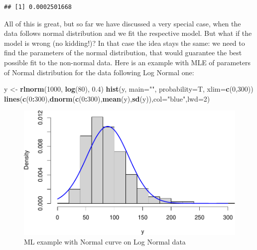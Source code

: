 \documentclass[
]{book}
\newenvironment{Shaded}{\begin{snugshade}}{\end{snugshade}}
\newcommand{\DataTypeTok}[1]{\textcolor[rgb]{0.13,0.29,0.53}{#1}}
\newcommand{\DecValTok}[1]{\textcolor[rgb]{0.00,0.00,0.81}{#1}}
\newcommand{\FloatTok}[1]{\textcolor[rgb]{0.00,0.00,0.81}{#1}}
\newcommand{\KeywordTok}[1]{\textcolor[rgb]{0.13,0.29,0.53}{\textbf{#1}}}
\newcommand{\NormalTok}[1]{#1}
\newcommand{\OperatorTok}[1]{\textcolor[rgb]{0.81,0.36,0.00}{\textbf{#1}}}
\newcommand{\StringTok}[1]{\textcolor[rgb]{0.31,0.60,0.02}{#1}}
\theoremstyle{definition}
\theoremstyle{definition}
\theoremstyle{definition}
\theoremstyle{definition}
\theoremstyle{remark}
\begin{document}
\begin{verbatim}
## [1] 0.0002501668
\end{verbatim}

All of this is great, but so far we have discussed a very special case, when the data follows normal distribution and we fit the respective model. But what if the model is wrong (no kidding!)? In that case the idea stays the same: we need to find the parameters of the normal distribution, that would guarantee the best possible fit to the non-normal data. Here is an example with MLE of parameters of Normal distribution for the data following Log Normal one:

\begin{Shaded}
\begin{Highlighting}[]
\NormalTok{y \textless{}{-}}\StringTok{ }\KeywordTok{rlnorm}\NormalTok{(}\DecValTok{1000}\NormalTok{, }\KeywordTok{log}\NormalTok{(}\DecValTok{80}\NormalTok{), }\FloatTok{0.4}\NormalTok{)}
\KeywordTok{hist}\NormalTok{(y, }\DataTypeTok{main=}\StringTok{""}\NormalTok{, }\DataTypeTok{probability=}\NormalTok{T, }\DataTypeTok{xlim=}\KeywordTok{c}\NormalTok{(}\DecValTok{0}\NormalTok{,}\DecValTok{300}\NormalTok{))}
\KeywordTok{lines}\NormalTok{(}\KeywordTok{c}\NormalTok{(}\DecValTok{0}\OperatorTok{:}\DecValTok{300}\NormalTok{),}\KeywordTok{dnorm}\NormalTok{(}\KeywordTok{c}\NormalTok{(}\DecValTok{0}\OperatorTok{:}\DecValTok{300}\NormalTok{),}\KeywordTok{mean}\NormalTok{(y),}\KeywordTok{sd}\NormalTok{(y)),}\DataTypeTok{col=}\StringTok{"blue"}\NormalTok{,}\DataTypeTok{lwd=}\DecValTok{2}\NormalTok{)}
\end{Highlighting}
\end{Shaded}

\begin{figure}
\centering
\includegraphics{Svetunkov---Statistics-for-Business-Analytics_files/figure-latex/MLENormalExample07-1.pdf}
\caption{\label{fig:MLENormalExample07}ML example with Normal curve on Log Normal data}
\end{figure}
\end{document}

